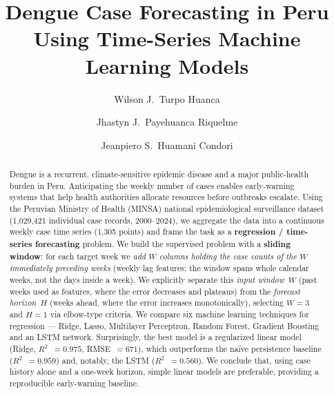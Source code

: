 \documentclass[runningheads]{llncs}
\newcommand{\Rsq}{$R^2$}
\begin{document}
\title{Dengue Case Forecasting in Peru Using Time-Series Machine Learning Models}

\author{Wilson J.\ Turpo Huanca \and
        Jhastyn J.\ Payehuanca Riquelme \and
        Jeanpiero S.\ Huamani Condori}


\maketitle

\begin{abstract}
  Dengue is a recurrent, climate-sensitive epidemic disease and a major public-health
  burden in Peru. Anticipating the weekly number of cases enables early-warning systems
  that help health authorities allocate resources before outbreaks escalate. Using the
  Peruvian Ministry of Health (MINSA) national epidemiological surveillance dataset
  (1{,}029{,}421 individual case records, 2000--2024), we aggregate the data into a
  continuous weekly case time series (1{,}305 points) and frame the task as a
  \textbf{regression / time-series forecasting} problem. We build the supervised problem
  with a \textbf{sliding window}:
  for each target week we \emph{add $W$ columns holding the case counts of the $W$
  immediately preceding weeks} (weekly lag features; the window spans whole calendar
  weeks, not the days inside a week). We explicitly separate this \emph{input window}~$W$ (past weeks used as
  features, where the error decreases and plateaus) from the \emph{forecast horizon}~$H$
  (weeks ahead, where the error increases monotonically), selecting $W=3$ and $H=1$ via
  elbow-type criteria. We compare six machine learning techniques for regression --- Ridge,
  Lasso, Multilayer Perceptron, Random Forest, Gradient Boosting and an LSTM network.
  Surprisingly, the best model is a regularized
  linear model (Ridge, \Rsq{}~$=0.975$, RMSE~$=671$), which outperforms the na\"ive
  persistence baseline (\Rsq{}~$=0.959$) and, notably, the LSTM (\Rsq{}~$=0.560$). We
  conclude that, using case history alone and a one-week horizon, simple linear models
  are preferable, providing a reproducible early-warning baseline.

\end{abstract}
\end{document}
